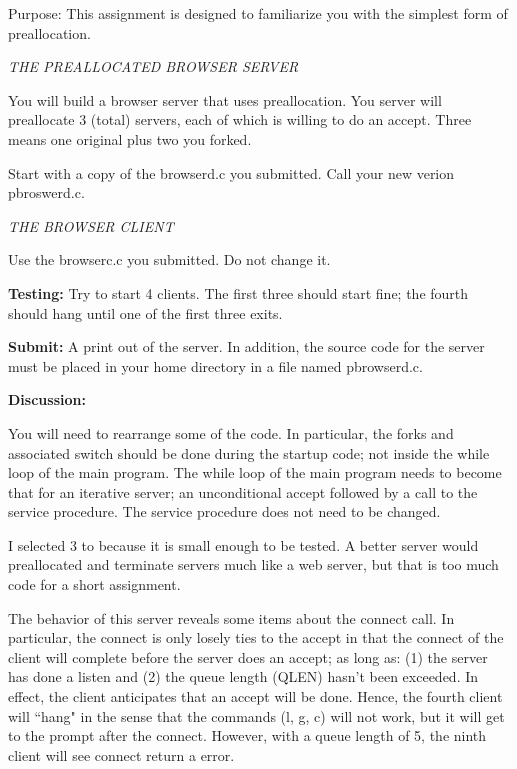 

\parindent 0pt

Purpose: This assignment is designed to familiarize you
with the simplest form of preallocation.

{\it THE PREALLOCATED BROWSER SERVER}

You will build a browser server that uses preallocation.
You server will preallocate 3 (total) servers,
each of which is willing to do an accept.
Three means one original plus two you forked.

Start with a copy of the {\ltt{}browserd.c} you submitted.
Call your new verion {\ltt{}pbroswerd.c}.

{\it THE BROWSER CLIENT}

Use the {\ltt{}browserc.c} you submitted.
Do not change it.

{\bf Testing:}
Try to start 4 clients.
The first three should start fine;
the fourth should hang until one of the first three exits.

{\bf Submit:}
A print out of the server.
In addition,
the source code for the server must be placed in your home directory
in a file named {\ltt{}pbrowserd.c}.

{\bf Discussion:}

You will need to rearrange some of the code.
In particular, the forks and associated switch
should be done during the startup code;
not inside the while loop of the main program.
The while loop of the main program needs to 
become that for an iterative server;
an unconditional accept followed by a call to
the service procedure.
The service procedure does not need to be changed.

I selected 3 to because it is small enough to be tested.
A better server would preallocated and terminate servers much like a web server,
but that is too much code for a short assignment.

The behavior of this server reveals some items about the {\ltt{}connect} call.
In particular, the {\ltt{}connect} is only losely ties to the {\ltt{}accept}
in that the {\ltt{}connect} of the client will complete before the server
does an {\ltt{}accept};
as long as:
(1) the server has done a {\ltt{}listen} and (2) the queue length ({\ltt{}QLEN}) hasn't
been exceeded.
In effect, the client anticipates that an {\ltt{}accept} will be done.
Hence, the fourth client will ``hang" in the sense that the commands ({\ltt{}l}, {\ltt{}g}, {\ltt{}c})
will not work, but it will get to the prompt after the connect.
However, with a queue length of 5, the ninth client will see {\ltt{}connect} return a error. 
\bye
